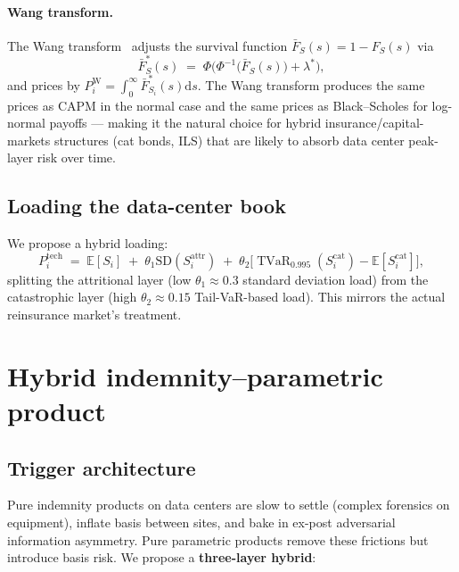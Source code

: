 \documentclass[11pt,a4paper]{article}
\let\origsection\section
\renewcommand{\section}{\clearpage\origsection}
\theoremstyle{ia}
\newcommand{\E}{\mathbb{E}}
\newcommand{\1}{\mathbf{1}}
\newcommand{\TVaR}{\operatorname{TVaR}}
\newcommand{\dd}{\mathrm{d}}
\begin{document}
\paragraph{Wang transform.}
The Wang transform~\citep{Wang2000} adjusts the survival function
$\bar F_S(s)=1-F_S(s)$ via
\begin{equation}\label{eq:wang}
   \bar F^{*}_S(s) \;=\; \Phi\bigl(\Phi^{-1}\!\bigl(\bar F_S(s)\bigr) + \lambda^*\bigr),
\end{equation}
and prices by $P^{\mathrm{W}}_i=\int_0^\infty \bar F^{*}_{S_i}(s)\dd s$.
The Wang transform produces the same prices as CAPM in the normal
case and the same prices as Black--Scholes for log-normal payoffs ---
making it the natural choice for hybrid insurance/capital-markets
structures (cat bonds, ILS) that are likely to absorb data center
peak-layer risk over time.

\subsection{Loading the data-center book}

We propose a hybrid loading:
\begin{equation}\label{eq:final}
   \boxed{\;
   P^{\mathrm{tech}}_i \;=\; \E[S_i]
   \;+\; \theta_1 \mathrm{SD}(S^{\mathrm{attr}}_i)
   \;+\; \theta_2 \bigl[\TVaR_{0.995}(S^{\mathrm{cat}}_i)-\E[S^{\mathrm{cat}}_i]\bigr] ,\;}
\end{equation}
splitting the attritional layer (low $\theta_1\approx 0.3$ standard
deviation load) from the catastrophic layer (high $\theta_2\approx 0.15$
Tail-VaR-based load). This mirrors the actual reinsurance market's
treatment.

\section{Hybrid indemnity--parametric product}\label{sec:product}

\subsection{Trigger architecture}

Pure indemnity products on data centers are slow to settle (complex
forensics on equipment), inflate basis between sites, and bake in
ex-post adversarial information asymmetry. Pure parametric products
remove these frictions but introduce basis risk. We propose a
\textbf{three-layer hybrid}:
\end{document}
